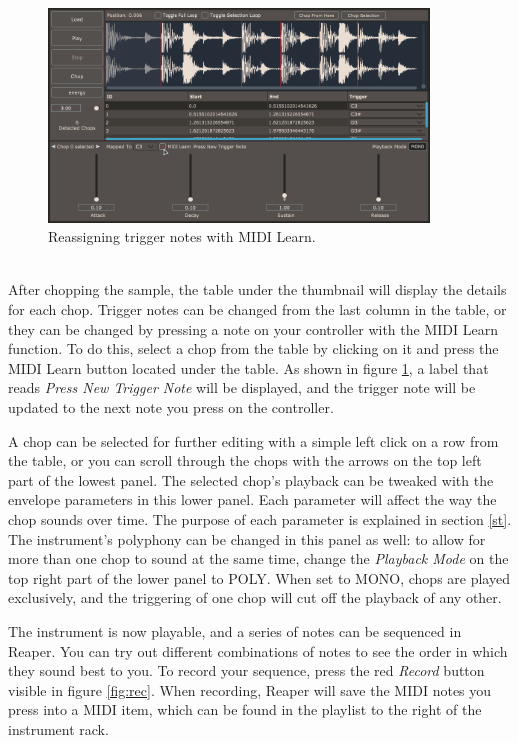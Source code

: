 \documentclass[12pt, a4paper, hidelinks]{article}
\begin{document}
	\begin{figure}[h!]
		\centering
		\includegraphics[width=0.9\textwidth]{u/learn.png}
		\caption{Reassigning trigger notes with MIDI Learn.}
		\label{fig:learn}
	\end{figure}	
	
	~\\
	After chopping the sample, the table under the thumbnail will display the details for each chop. Trigger notes can be changed from the last column in the table, or they can be changed by pressing a note on your controller with the MIDI Learn function. To do this, select a chop from the table by clicking on it and press the MIDI Learn button located under the table. As shown in figure \ref{fig:learn}, a label that reads \textit{Press New Trigger Note} will be displayed, and the trigger note will be updated to the next note you press on the controller. \par
	
	A chop can be selected for further editing with a simple left click on a row from the table, or you can scroll through the chops with the arrows on the top left part of the lowest panel. The selected chop's playback can be tweaked with the envelope parameters in this lower panel. Each parameter will affect the way the chop sounds over time. The purpose of each parameter is explained in section \ref{st}. The instrument's polyphony can be changed in this panel as well: to allow for more than one chop to sound at the same time, change the \textit{Playback Mode} on the top right part of the lower panel to POLY. When set to MONO, chops are played exclusively, and the triggering of one chop will cut off the playback of any other.
	
	The instrument is now playable, and a series of notes can be sequenced in Reaper. You can try out different combinations of notes to see the order in which they sound best to you. To record your sequence, press the red \textit{Record} button visible in figure \ref{fig:rec}. When recording, Reaper will save the MIDI notes you press into a MIDI item, which can be found in the playlist to the right of the instrument rack. \par
	
\end{document}
